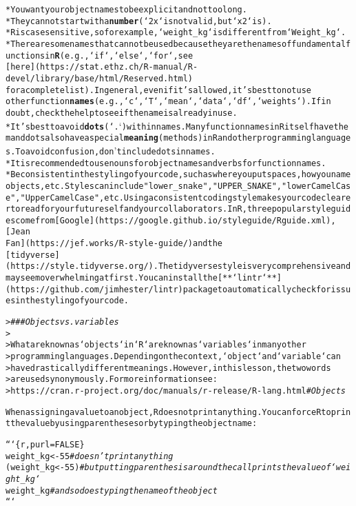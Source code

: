 \documentclass{article}\usepackage[]{graphicx}\usepackage[]{xcolor}
\makeatletter
\newcommand{\hlstr}[1]{\textcolor[rgb]{0.192,0.494,0.8}{#1}}%
\newcommand{\hlcom}[1]{\textcolor[rgb]{0.678,0.584,0.686}{\textit{#1}}}%
\newcommand{\hlkwd}[1]{\textcolor[rgb]{0.737,0.353,0.396}{\textbf{#1}}}%
\newenvironment{kframe}{%
 \def\at@end@of@kframe{}%
 \ifinner\ifhmode%
  \def\at@end@of@kframe{\end{minipage}}%
  \begin{minipage}{\columnwidth}%
 \fi\fi%
 \def\FrameCommand##1{\hskip\@totalleftmargin \hskip-\fboxsep
 \colorbox{shadecolor}{##1}\hskip-\fboxsep
     \hskip-\linewidth \hskip-\@totalleftmargin \hskip\columnwidth}%
 \MakeFramed {\advance\hsize-\width
   \@totalleftmargin\z@ \linewidth\hsize
   \@setminipage}}%
 {\par\unskip\endMakeFramed%
 \at@end@of@kframe}
\newenvironment{knitrout}{}{} %
\makeatother
\begin{document}
\begin{knitrout}
\begin{kframe}
\begin{alltt}
* You want your object names to be explicit and not too long.
* They cannot start with a \hlkwd{number} (`2x` is not valid, but `x2` is).
* R is case sensitive, so for example, `weight_kg` is different from `Weight_kg`.
* There are some names that cannot be used because they are the names of fundamental functions in \hlkwd{R} (e.g., `if`, `else`, `for`, see
[here](https://stat.ethz.ch/R-manual/R-devel/library/base/html/Reserved.html)
for a complete list). In general, even if it\hlstr{'s allowed, it'}s best to not use
other function \hlkwd{names} (e.g., `c`, `T`, `mean`, `data`, `df`, `weights`). If in
doubt, check the help to see if the name is already in use.
* It\hlstr{'s best to avoid \hlkwd{dots} (`.`) within names. Many function names in R itself have them and dots also have a special \hlkwd{meaning} (methods) in R and other programming languages. To avoid confusion, don'}t include dots in names.
* It is recommended to use nouns for object names and verbs for function names.
* Be consistent in the styling of your code, such as where you put spaces, how you name objects, etc. Styles can include \hlstr{"lower_snake"}, \hlstr{"UPPER_SNAKE"}, \hlstr{"lowerCamelCase"}, \hlstr{"UpperCamelCase"}, etc. Using a consistent coding style makes your code clearer to read for your future self and your collaborators. In R, three popular style guides come from [Google](https://google.github.io/styleguide/Rguide.xml), [Jean
Fan](https://jef.works/R-style-guide/) and the
[tidyverse](https://style.tidyverse.org/). The tidyverse style is very comprehensive and may seem overwhelming at first. You can install the [**`lintr`**](https://github.com/jimhester/lintr) package to automatically check for issues in the styling of your code.

> \hlcom{### Objects vs. variables}
>
> What are known as `objects` in `R` are known as `variables` in many other
> programming languages. Depending on the context, `object` and `variable` can
> have drastically different meanings. However, in this lesson, the two words
> are used synonymously. For more information see:
> https://cran.r-project.org/doc/manuals/r-release/R-lang.html\hlcom{#Objects}


When assigning a value to an object, R does not print anything. You can force R to print the value by using parentheses or by typing the object name:

```\{r, purl = FALSE\}
weight_kg <- 55    \hlcom{# doesn't print anything}
(weight_kg <- 55)  \hlcom{# but putting parenthesis around the call prints the value of `weight_kg`}
weight_kg          \hlcom{# and so does typing the name of the object}
```


\end{alltt}
\end{kframe}
\end{knitrout}
\end{document}
